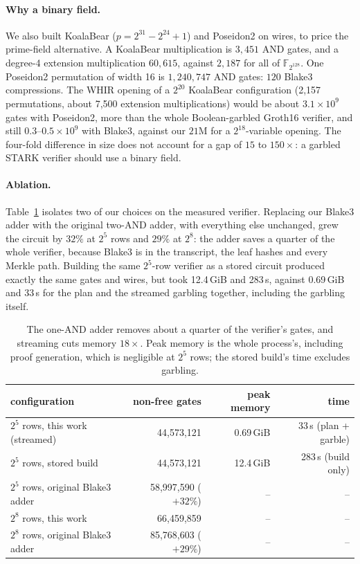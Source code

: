 \documentclass[11pt]{article}
\newcommand{\F}{\mathbb{F}_{2^{128}}}
\newcommand{\AND}{\textsf{AND}}
\begin{document}
\paragraph{Why a binary field.} We also built KoalaBear
($p=2^{31}-2^{24}+1$) and Poseidon2 on wires, to price the prime-field
alternative. A KoalaBear multiplication is $3{,}451$ \AND{} gates, and a
degree-4 extension multiplication $60{,}615$, against $2{,}187$ for all of
$\F$. One Poseidon2 permutation of width 16 is $1{,}240{,}747$ \AND{} gates:
$120$ Blake3 compressions. The WHIR opening of a $2^{20}$ KoalaBear
configuration (2{,}157 permutations, about 7{,}500 extension multiplications)
would be about $3.1\times10^9$ gates with Poseidon2, more than the whole
Boolean-garbled Groth16 verifier, and still $0.3$--$0.5\times10^9$ with Blake3,
against our $21$M for a $2^{18}$-variable opening. The four-fold difference in
size does not account for a gap of $15$ to $150\times$: a garbled STARK verifier
should use a binary field.

\paragraph{Ablation.} Table~\ref{tab:ablation} isolates two of our choices on
the measured verifier. Replacing our Blake3 adder with the original two-\AND{} adder,
with everything else unchanged, grew the circuit by $32\%$ at $2^5$ rows and
$29\%$ at $2^8$: the adder saves a quarter of the whole verifier, because Blake3
is in the transcript, the leaf hashes and every Merkle path. Building the same
$2^5$-row verifier as a stored circuit produced exactly the same gates and wires,
but took 12.4\,GiB and 283\,s, against 0.69\,GiB and 33\,s for the plan and the
streamed garbling together, including the garbling itself.

\begin{table}[t]\centering\small
\begin{tabular}{lrrr}\toprule
configuration & non-free gates & peak memory & time\\\midrule
$2^5$ rows, this work (streamed) & 44{,}573{,}121 & 0.69\,GiB & 33\,s (plan + garble)\\
$2^5$ rows, stored build & 44{,}573{,}121 & 12.4\,GiB & 283\,s (build only)\\
$2^5$ rows, original Blake3 adder & 58{,}997{,}590 ($+32\%$) & -- & --\\\midrule
$2^8$ rows, this work & 66{,}459{,}859 & -- & --\\
$2^8$ rows, original Blake3 adder & 85{,}768{,}603 ($+29\%$) & -- & --\\\bottomrule
\end{tabular}
\caption{The one-\AND{} adder removes about a quarter of the verifier's gates, and
streaming cuts memory $18\times$. Peak memory is the whole process's, including
proof generation, which is negligible at $2^5$ rows; the stored build's time
excludes garbling.}
\label{tab:ablation}
\end{table}
\end{document}
